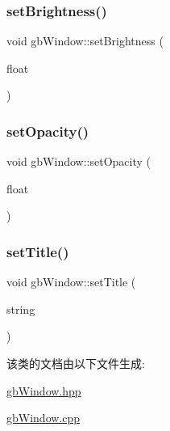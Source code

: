 \mbox{\label{classgb_window_ad05c721b3e04f23f0e6b72e4c411be1c}} 
\subsubsection{\texorpdfstring{setBrightness()}{setBrightness()}}
{\footnotesize\ttfamily void gb\+Window\+::set\+Brightness (\begin{DoxyParamCaption}\item[{float}]{ }\end{DoxyParamCaption})}

\mbox{\label{classgb_window_a4a89c22270c639142295477ab37e838f}} 
\subsubsection{\texorpdfstring{setOpacity()}{setOpacity()}}
{\footnotesize\ttfamily void gb\+Window\+::set\+Opacity (\begin{DoxyParamCaption}\item[{float}]{ }\end{DoxyParamCaption})}

\mbox{\label{classgb_window_ab7a05f81b0191dbccafc897287d1b759}} 
\subsubsection{\texorpdfstring{setTitle()}{setTitle()}}
{\footnotesize\ttfamily void gb\+Window\+::set\+Title (\begin{DoxyParamCaption}\item[{string}]{ }\end{DoxyParamCaption})}



该类的文档由以下文件生成\+:\begin{DoxyCompactItemize}
\item 
\mbox{\hyperlink{gb_window_8hpp}{gb\+Window.\+hpp}}\item 
\mbox{\hyperlink{gb_window_8cpp}{gb\+Window.\+cpp}}\end{DoxyCompactItemize}
